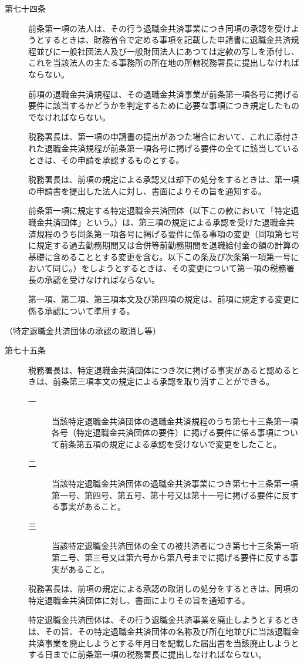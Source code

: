 \documentclass[twocolumn,a4j,10pt]{ltjtarticle}
\begin{document}
\begin{description}
\item[第七十四条]前条第一項の法人は、その行う退職金共済事業につき同項の承認を受けようとするときは、財務省令で定める事項を記載した申請書に退職金共済規程並びに一般社団法人及び一般財団法人にあつては定款の写しを添付し、これを当該法人の主たる事務所の所在地の所轄税務署長に提出しなければならない。
\item[]前項の退職金共済規程は、その退職金共済事業が前条第一項各号に掲げる要件に該当するかどうかを判定するために必要な事項につき規定したものでなければならない。
\item[]税務署長は、第一項の申請書の提出があつた場合において、これに添付された退職金共済規程が前条第一項各号に掲げる要件の全てに該当しているときは、その申請を承認するものとする。
\item[]税務署長は、前項の規定による承認又は却下の処分をするときは、第一項の申請書を提出した法人に対し、書面によりその旨を通知する。
\item[]前条第一項に規定する特定退職金共済団体（以下この款において「特定退職金共済団体」という。）は、第三項の規定による承認を受けた退職金共済規程のうち同条第一項各号に掲げる要件に係る事項の変更（同項第七号に規定する過去勤務期間又は合併等前勤務期間を退職給付金の額の計算の基礎に含めることとする変更を含む。以下この条及び次条第一項第一号において同じ。）をしようとするときは、その変更について第一項の税務署長の承認を受けなければならない。
\item[]第一項、第二項、第三項本文及び第四項の規定は、前項に規定する変更に係る承認について準用する。
\end{description}
\noindent\hspace{10pt}（特定退職金共済団体の承認の取消し等）
\begin{description}
\item[第七十五条]税務署長は、特定退職金共済団体につき次に掲げる事実があると認めるときは、前条第三項本文の規定による承認を取り消すことができる。
\begin{description}
\item[一]当該特定退職金共済団体の退職金共済規程のうち第七十三条第一項各号（特定退職金共済団体の要件）に掲げる要件に係る事項について前条第五項の規定による承認を受けないで変更をしたこと。
\item[二]当該特定退職金共済団体の退職金共済事業につき第七十三条第一項第一号、第四号、第五号、第十号又は第十一号に掲げる要件に反する事実があること。
\item[三]当該特定退職金共済団体の全ての被共済者につき第七十三条第一項第二号、第三号又は第六号から第八号までに掲げる要件に反する事実があること。
\end{description}
\item[]税務署長は、前項の規定による承認の取消しの処分をするときは、同項の特定退職金共済団体に対し、書面によりその旨を通知する。
\item[]特定退職金共済団体は、その行う退職金共済事業を廃止しようとするときは、その旨、その特定退職金共済団体の名称及び所在地並びに当該退職金共済事業を廃止しようとする年月日を記載した届出書を当該廃止しようとする日までに前条第一項の税務署長に提出しなければならない。
\end{description}
\end{document}
